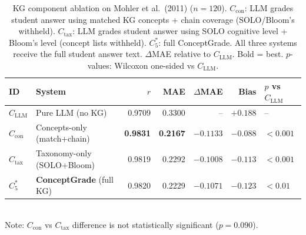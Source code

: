 \begin{table}[ht]\centering
\caption{KG component ablation on Mohler et al.\ (2011) ($n=120$).
$C_{\text{con}}$: LLM grades student answer using matched KG concepts + chain coverage (SOLO/Bloom's withheld).
$C_{\text{tax}}$: LLM grades student answer using SOLO cognitive level + Bloom's level (concept lists withheld).
$C_5^{*}$: full ConceptGrade.
All three systems receive the full student answer text.
$\Delta$MAE relative to $C_{\text{LLM}}$. Bold = best. $p$-values: Wilcoxon one-sided vs $C_{\text{LLM}}$.}
\label{tab:component_ablation}
\begin{tabular}{@{}llrrrrl@{}}\toprule
\textbf{ID} & \textbf{System} & \textbf{$r$} & \textbf{MAE} & \textbf{$\Delta$MAE} & \textbf{Bias} & \textbf{$p$ vs $C_{\text{LLM}}$} \\\midrule
$C_{\text{LLM}}$ & Pure LLM (no KG) & 0.9709 & 0.3300 & -- & $+0.188$ & -- \\
\midrule
$C_{\text{con}}$ & Concepts-only (match+chain) & \textbf{0.9831} & \textbf{0.2167} & $-0.1133$ & $-0.088$ & $<0.001$ \\
$C_{\text{tax}}$ & Taxonomy-only (SOLO+Bloom) & 0.9819 & 0.2292 & $-0.1008$ & $-0.113$ & $<0.001$ \\
$C_5^{*}$        & \textbf{ConceptGrade} (full KG) & 0.9820 & 0.2229 & $-0.1071$ & $-0.123$ & $<0.01$ \\
\bottomrule
\end{tabular}
\\\small Note: $C_{\text{con}}$ vs $C_{\text{tax}}$ difference is not statistically significant ($p=0.090$).
\end{table}

